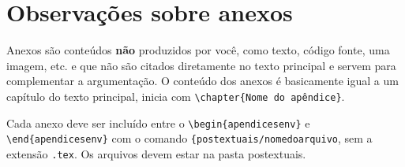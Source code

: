 \chapter{Observações sobre anexos}

Anexos são conteúdos \textbf{não} produzidos por você, como texto, código fonte, uma imagem, etc. e que não são citados diretamente no texto principal e servem para complementar a argumentação. O conteúdo dos anexos é basicamente igual a um capítulo do texto principal, inicia com \verb|\chapter{Nome do apêndice}|. 

Cada anexo deve ser incluído entre o \verb|\begin{apendicesenv}| e \verb|\end{apendicesenv}| com o comando \verb|{postextuais/nomedoarquivo|, sem a extensão \verb|.tex|. Os arquivos devem estar na pasta postextuais.